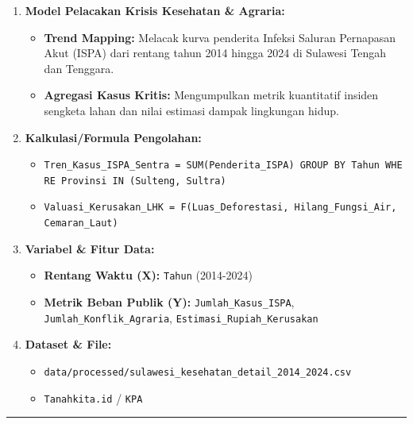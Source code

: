 \documentclass[
]{article}
\providecommand{\tightlist}{%
  \setlength{\itemsep}{0pt}\setlength{\parskip}{0pt}}
\begin{document}
\begin{enumerate}
\def\labelenumi{\arabic{enumi}.}
\tightlist
\item
  \textbf{Model Pelacakan Krisis Kesehatan \& Agraria:}

  \begin{itemize}
  \tightlist
  \item
    \textbf{Trend Mapping:} Melacak kurva penderita Infeksi Saluran
    Pernapasan Akut (ISPA) dari rentang tahun 2014 hingga 2024 di
    Sulawesi Tengah dan Tenggara.
  \item
    \textbf{Agregasi Kasus Kritis:} Mengumpulkan metrik kuantitatif
    insiden sengketa lahan dan nilai estimasi dampak lingkungan hidup.
  \end{itemize}
\item
  \textbf{Kalkulasi/Formula Pengolahan:}

  \begin{itemize}
  \tightlist
  \item
    \texttt{Tren\_Kasus\_ISPA\_Sentra\ =\ SUM(Penderita\_ISPA)\ GROUP\ BY\ Tahun\ WHERE\ Provinsi\ IN\ (Sulteng,\ Sultra)}
  \item
    \texttt{Valuasi\_Kerusakan\_LHK\ =\ F(Luas\_Deforestasi,\ Hilang\_Fungsi\_Air,\ Cemaran\_Laut)}
  \end{itemize}
\item
  \textbf{Variabel \& Fitur Data:}

  \begin{itemize}
  \tightlist
  \item
    \textbf{Rentang Waktu (X):} \texttt{Tahun} (2014-2024)
  \item
    \textbf{Metrik Beban Publik (Y):} \texttt{Jumlah\_Kasus\_ISPA},
    \texttt{Jumlah\_Konflik\_Agraria},
    \texttt{Estimasi\_Rupiah\_Kerusakan}
  \end{itemize}
\item
  \textbf{Dataset \& File:}

  \begin{itemize}
  \tightlist
  \item
    \texttt{data/processed/sulawesi\_kesehatan\_detail\_2014\_2024.csv}
  \item
    \texttt{Tanahkita.id} / \texttt{KPA}
  \end{itemize}
\end{enumerate}

\begin{center}\rule{0.5\linewidth}{0.5pt}\end{center}
\end{document}
